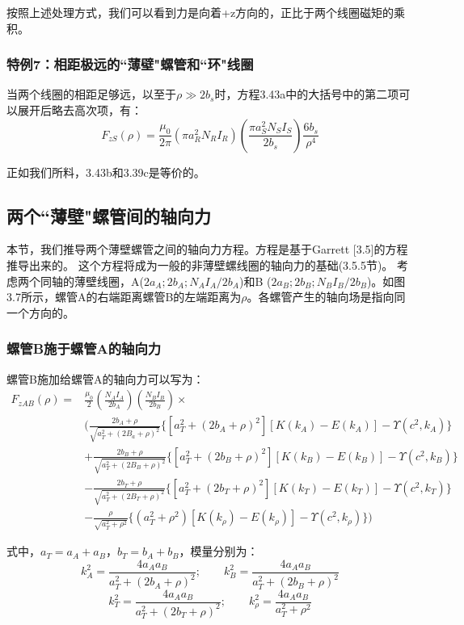 按照上述处理方式，我们可以看到力是向着+z方向的，正比于两个线圈磁矩的乘积。

\subsubsection{特例7：相距极远的``薄壁"螺管和``环"线圈}
当两个线圈的相距足够远，以至于$\rho \gg 2b_s$时，方程3.43a中的大括号中的第二项可以展开后略去高次项，有：
\begin{equation*}
F_{zS}(\rho)=\frac{\mu_0}{2\pi}(\pi a_R^2 N_R I_R)(\frac{\pi a_S^2 N_S I_S}{2 b_s})\frac{6b_s}{\rho^4} \tag{3.43'}
\end{equation*}

正如我们所料，3.43b和3.39c是等价的。

\subsection{两个``薄壁"螺管间的轴向力}
本节，我们推导两个薄壁螺管之间的轴向力方程。方程是基于Garrett [3.5]的方程推导出来的。
这个方程将成为一般的非薄壁螺线圈的轴向力的基础(3.5.5节)。
考虑两个同轴的薄壁线圈，A($2a_A; 2b_A; N_A I_A/2b_A$)和B ($2a_B; 2b_B;
N_B I_B/2b_B$)。如图3.7所示，螺管A的右端距离螺管B的左端距离为$\rho$。各螺管产生的轴向场是指向同一个方向的。

\subsubsection{螺管B施于螺管A的轴向力}
螺管B施加给螺管A的轴向力可以写为：
\begin{equation}
\begin{split}
F_{zAB}(\rho)=&\frac{\mu_0}{2}(\frac{N_A I_A}{2b_A})(\frac{N_B I_B}{2b_B})\times \\
&\bigg(\frac{2b_A+\rho}{\sqrt{a_T^2+(2B_a+\rho)^2}} \{[a_T^2+(2b_A+\rho)^2][K(k_{A})-E(k_{A})]-\Upsilon(c^2,k_A)\}\\
&+\frac{2b_B+\rho}{\sqrt{a_T^2+(2B_B+\rho)^2}} \{[a_T^2+(2b_B+\rho)^2][K(k_{B})-E(k_{B})]-\Upsilon(c^2,k_B) \}\\
&-\frac{2b_T+\rho}{\sqrt{a_T^2+(2B_T+\rho)^2}} \{[a_T^2+(2b_T+\rho)^2][K(k_{T})-E(k_{T})]-\Upsilon(c^2,k_T) \}\\
&-\frac{\rho}{\sqrt{a_T^2+\rho^2}}\{(a_T^2+\rho^2)[K(k_\rho)-E(k_\rho)]-\Upsilon(c^2,k_\rho)\}\bigg)
\end{split}
\end{equation}

式中，$a_T=a_A+a_B$，$b_T=b_A+b_B$，模量分别为：
$$k_{A}^2=\frac{4a_A a_B}{a_T^2+(2b_A+\rho)^2} ;\qquad k_{B}^2=\frac{4a_A a_B}{a_T^2+(2b_B+\rho)^2} $$
$$k_{T}^2=\frac{4a_A a_B}{a_T^2+(2b_T+\rho)^2} ;\qquad k_{\rho}^2=\frac{4a_A a_B}{a_T^2+\rho^2} $$

